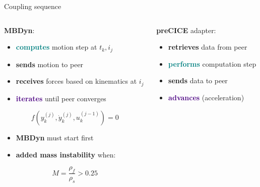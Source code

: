 \documentclass[10pt,t]{beamer}
\begin{document}
\begin{frame}{Coupling sequence}
    


\begin{columns}


\begin{column}{0.5\textwidth}
\textcolor{dorange}{\textbf{MBDyn}}:

\vspace{0.2cm}

\begin{itemize}
    \item \textcolor{teal}{\textbf{computes}} motion step at $t_k, i_j$
    \item \textcolor{fgreen}{\textbf{sends}} motion to peer
    \item \textcolor{dblue}{\textbf{receives}} forces based on kinematics at $i_j$
    \item \textcolor{indigo}{\textbf{iterates}} until peer converges
\end{itemize}

$$f\left(y_k^{(j)},\dot{y}_k^{(j)},u_k^{(j-1)}\right)=0$$

\pause

\begin{itemize}
    \item \textcolor{dorange}{\textbf{MBDyn}} must start first
    \item \textbf{added mass instability} when:
\end{itemize}

$$M = \frac{\rho_f}{\rho_s} > 0.25$$


\end{column}

\pause
\vrule{}
\begin{column}{0.5\textwidth}
\textcolor{pblue}{\textbf{preCICE}} adapter:

\vspace{0.2cm}

\begin{itemize}
    \item \textcolor{dblue}{\textbf{retrieves}} data from peer
    \item \textcolor{teal}{\textbf{performs}} computation step
    \item \textcolor{fgreen}{\textbf{sends}} data to peer
    \item \textcolor{indigo}{\textbf{advances}} (acceleration)
\end{itemize}




\end{column}
\end{columns}
\end{frame}
\end{document}
